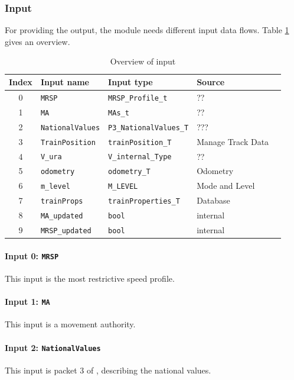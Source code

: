 \subsubsection{Input}
For providing the output, the module needs different input data flows. Table \ref{tbl:speedsupervisionInput} gives an overview.

\begin{table}[H]
  \begin{tabular}{| c | l | l | l | l |}
    \hline
    \textbf{Index} & \textbf{Input name} & \textbf{Input type} & \textbf{Source}\\ \hline
    0 & \texttt{MRSP} & \texttt{MRSP\_Profile\_t} & ?? \\
    1 & \texttt{MA} & \texttt{MAs\_t} & ??\\
    2 & \texttt{NationalValues} & \texttt{P3\_NationalValues\_T} & ???\\
    3 & \texttt{TrainPosition} & \texttt{trainPosition\_T} & Manage Track Data\\
    4 & \texttt{V\_ura} & \texttt{V\_internal\_Type} & ??\\
    5 & \texttt{odometry} & \texttt{odometry\_T} & Odometry\\
    6 & \texttt{m\_level} & \texttt{M\_LEVEL} & Mode and Level\\
    7 & \texttt{trainProps} & \texttt{trainProperties\_T} & Database\\
    8 & \texttt{MA\_updated} & \texttt{bool} & internal\\
		9 & \texttt{MRSP\_updated} & \texttt{bool} & internal\\
    \hline
  \end{tabular} 
  \caption{Overview of input}
  \label{tbl:speedsupervisionInput}
\end{table}

\paragraph{Input 0: \texttt{MRSP}}
This input is the most restrictive speed profile.
\paragraph{Input 1: \texttt{MA}}
This input is a movement authority.
\paragraph{Input 2: \texttt{NationalValues}}
This input is packet 3 of \cite[Chapt.~8]{subset-026}, describing the national values. 

